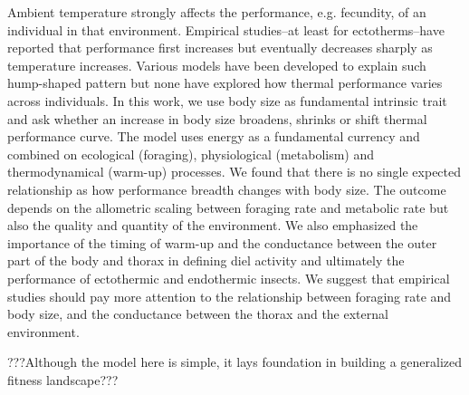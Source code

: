 Ambient temperature strongly affects the performance, e.g. fecundity, of an individual in that environment.
Empirical studies--at least for ectotherms--have reported that performance first increases but eventually decreases sharply as temperature increases. Various models have been developed to explain such hump-shaped pattern but none have explored how thermal performance varies across individuals.
In this work, we use body size as fundamental intrinsic trait and ask whether an increase in body size broadens, shrinks or shift thermal performance curve. The model uses energy as a fundamental currency and combined on ecological (foraging), physiological (metabolism) and thermodynamical (warm-up) processes. We found that there is no single expected relationship as how performance breadth changes with body size.
The outcome depends on the allometric scaling between foraging rate and metabolic rate but also the quality and quantity of the environment.
We also emphasized the importance of the timing of warm-up and the conductance between the outer part of the body and thorax in defining diel activity and ultimately the performance of ectothermic and endothermic insects.
We suggest that empirical studies should pay more attention to the relationship between foraging rate and body size, and the conductance between the thorax and the external environment.

???Although the model here is simple, it lays foundation in building a generalized fitness landscape???
